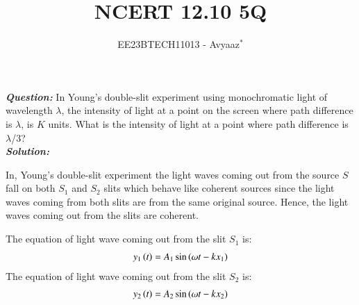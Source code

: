 \documentclass[journal,12pt,twocolumn]{IEEEtran}
\theoremstyle{remark}
\begin{document}

\vspace{3cm}

\title{NCERT 12.10 5Q}
\author{EE23BTECH11013 - Avyaaz$^{*}$%
}
\maketitle
\newpage
\bigskip

\renewcommand{\thefigure}{\theenumi}
\renewcommand{\thetable}{\arabic{table}}

\large\textbf{\textsl{Question:}}
In Young’s double-slit experiment using monochromatic light of wavelength $\lambda$, the intensity of light at a point on the screen where path difference is $\lambda$, is $K$ units. What is the intensity of light at a
point where path difference is $\lambda$/3?\\
\large\textbf{\textsl{Solution:}}\\
\begin{table}[htbp]
\centering

\vspace{0.2cm}
\caption{\normalsize $Parameters$}
\label{tab:parameters}
\end{table}




In, Young's double-slit experiment the light waves coming out from the source $S$ fall on both $S_1$ and $S_2$ slits which behave like coherent sources since the light waves coming from both slits are from the same original source. Hence, the light waves coming out from the slits are coherent.

\vspace{0.3cm}

The equation of light wave coming out from the slit $S_1$ is:
\begin{align}
    y_1\left(t\right) = A_1\sin{(\omega t - kx_1)} \label{phase_1}
\end{align}
The equation of light wave coming out from the slit $S_2$ is:
\begin{align}
     y_2\left(t\right) = A_2\sin{(\omega t - kx_2)} \label{phase_2}
\end{align}
\end{document}

